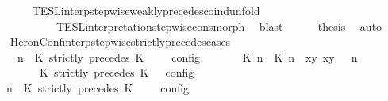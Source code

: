 \begin{isabellebody}
\ \ \ \ \ \ \isamarkupfalse%
\ TESL{\isacharunderscore}interp{\isacharunderscore}stepwise{\isacharunderscore}weakly{\isacharunderscore}precedes{\isacharunderscore}coind{\isacharunderscore}unfold\isanewline
\ \ \ \ \ \ \ \ \ \ \ \ TESL{\isacharunderscore}interpretation{\isacharunderscore}stepwise{\isacharunderscore}cons{\isacharunderscore}morph\ \isamarkupfalse%
\ blast\isanewline
\ \ \ \ \isamarkupfalse%
\ {\isacharquery}thesis\ \isamarkupfalse%
\ auto\isanewline
\ \ \isamarkupfalse%
\isanewline
{}\isamarkupfalse%
%
\endisatagproof
{\isafoldproof}%
%
\isadelimproof
\isanewline
%
\endisadelimproof
\isanewline
{}\isamarkupfalse%
\ HeronConf{\isacharunderscore}interp{\isacharunderscore}stepwise{\isacharunderscore}strictly{\isacharunderscore}precedes{\isacharunderscore}cases{\isacharcolon}\isanewline
\ \ \ {\isacartoucheopen}{\isasymlbrakk}\ {\isasymGamma}{\isacharcomma}\ n\ {\isasymturnstile}\ {\isacharparenleft}{\isacharparenleft}K\ strictly\ precedes\ K\ {\isacharhash}\ {\isasymPsi}{\isacharparenright}\ {\isasymtriangleright}\ {\isasymPhi}\ {\isasymrbrakk}\isactrlsub c\isactrlsub o\isactrlsub n\isactrlsub f\isactrlsub i\isactrlsub g\isanewline
\ \ \ \ {\isacharequal}\ {\isasymlbrakk}\ {\isacharparenleft}{\isacharparenleft}{\isasymlceil}{\isacharhash}\isactrlsup {\isasymle}\ K\ n{\isacharcomma}\ {\isacharhash}\isactrlsup {\isacharless}\ K\ n{\isasymrceil}\ {\isasymin}\ {\isacharparenleft}{\isasymlambda}{\isacharparenleft}x{\isacharcomma}y{\isacharparenright}{\isachardot}\ x{\isasymle}y{\isacharparenright}{\isacharparenright}\ {\isacharhash}\ {\isasymGamma}{\isacharparenright}{\isacharcomma}\ n\isanewline
\ \ \ \ \ \ {\isasymturnstile}\ {\isasymPsi}\ {\isasymtriangleright}\ {\isacharparenleft}{\isacharparenleft}K\ strictly\ precedes\ K\ {\isacharhash}\ {\isasymPhi}{\isacharparenright}\ {\isasymrbrakk}\isactrlsub c\isactrlsub o\isactrlsub n\isactrlsub f\isactrlsub i\isactrlsub g{\isacartoucheclose}\isanewline
%
\isadelimproof
%
\endisadelimproof
%
\isatagproof
{}\isamarkupfalse%
\ {\isacharminus}\isanewline
\ \ \isamarkupfalse%
\ {\isacartoucheopen}{\isasymlbrakk}\ {\isasymGamma}{\isacharcomma}\ n\ {\isasymturnstile}\ {\isacharparenleft}K\ strictly\ precedes\ K\ {\isacharhash}\ {\isasymPsi}\ {\isasymtriangleright}\ {\isasymPhi}\ {\isasymrbrakk}\isactrlsub c\isactrlsub o\isactrlsub n\isactrlsub f\isactrlsub i\isactrlsub g\isanewline

\end{isabellebody}
